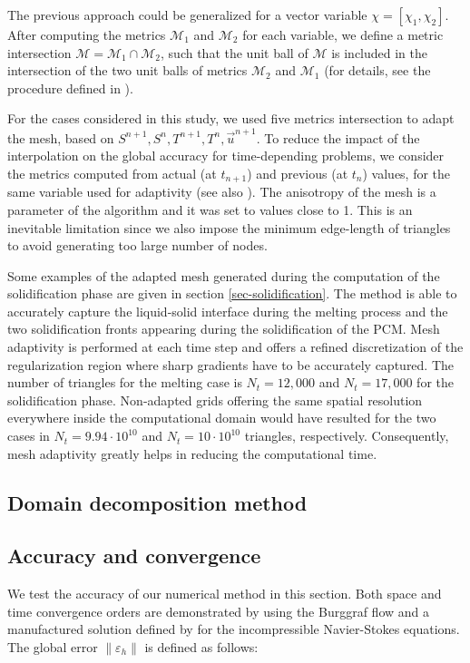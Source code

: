 The previous approach could be generalized for a vector variable $\chi=[\chi_1, \chi_2]$.
After computing the metrics $\mathcal{M}_{1}$ and $\mathcal{M}_{2}$ for each variable, we define a metric intersection  $\mathcal{M} = \mathcal{M}_{1} \cap \mathcal{M}_{2}$,
such that the unit ball of $\mathcal{M}$ is included in  the intersection of the two  unit balls  of metrics $\mathcal{M}_{2}$ and $\mathcal{M}_{1}$ (for details, see the  procedure defined in \cite{frey-george-1999}). 

For the cases considered in this study, we used five metrics intersection to adapt the mesh, based on $S^{n+1}, S^{n}, T^{n+1}, T^{n}, \vec{u}^{n+1}$. To reduce the impact of the interpolation on the global accuracy for time-depending problems, we consider the metrics computed from actual (at $t_{n+1}$) and  previous (at $t_{n}$) values, for the same variable used for adaptivity (see also \cite{Belhamadia2004_S}).
The anisotropy of the mesh is a parameter of the algorithm and it was set to values close to 1. This is an inevitable limitation since we also impose the minimum edge-length of triangles to avoid generating too large number of nodes.

Some examples of the adapted mesh generated during the computation of the solidification phase are given in section \ref{sec-solidification}.
The method is able to accurately capture the liquid-solid interface during the melting process and the two solidification fronts appearing during the solidification of the PCM. 
Mesh adaptivity is performed at each time step and offers a refined discretization of the regularization region where sharp gradients have to be accurately captured.  The number of triangles for the melting case is $N_t=12,000$ and $N_t=17,000$ for the solidification phase. Non-adapted grids offering the same spatial resolution everywhere inside the computational domain would have resulted for the two cases in $N_t=9.94 \cdot 10^{10}$ and $N_t=10 \cdot 10^{10}$ triangles, respectively. Consequently, mesh adaptivity greatly helps in reducing the computational time. 


\subsection{Domain decomposition method}



\subsection{Accuracy and convergence} \label{subsec-conv}
We test the accuracy of our numerical method in this section.
Both space and time convergence orders are demonstrated by using the Burggraf flow and a manufactured solution defined by \cite{nourgaliev2016fully} for the incompressible Navier-Stokes equations.
The global error $ \| \varepsilon_h \|$ is defined as follows:

